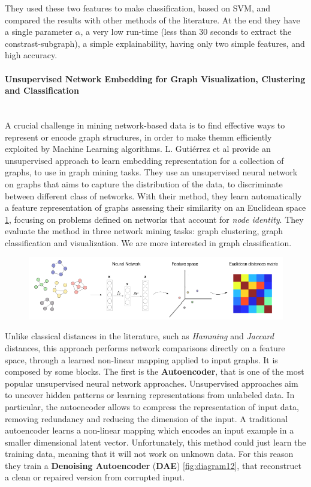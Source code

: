 They used these two features to make classification, based on SVM, and compared the results with other methods of the literature. At the end they have a single parameter $\alpha$, a very low run-time (less than 30 seconds to extract the constrast-subgraph), a simple explainability, having only two simple features, and high accuracy. 

\paragraph{Unsupervised Network Embedding for Graph Visualization, Clustering and Classification}\
\\

A crucial challenge in mining network-based data is to find effective ways to represent or encode graph structures, in order to make themm efficiently exploited by Machine Learning algorithms. L. Gutiérrez et al \cite{GutierrezUn} provide an unsupervised approach to learn embedding representation for a collection of graphs, to use in graph mining tasks. They use an unsupervised neural network on graphs that aims to capture the distribution of the data, to discriminate between different class of networks. With their method, they learn automatically a feature representation of graphs assessing their similarity on an Euclidean space \ref{fig:diagram11}, focusing on problems defined on networks that account for \textit{node identity}. They evaluate the method in three network mining tasks: graph clustering, graph classification and visualization. We are more interested in graph classification.

\begin{figure}[htbp]
	\centering
	\includegraphics[scale=0.5]{Immagini/Unsupervised.PNG}
	\caption{\label{fig:diagram11}}
\end{figure}


Unlike classical distances in the literature, such as \textit{Hamming} and \textit{Jaccard} distances, this approach performs network comparisons directly on a feature space, through a learned non-linear mapping applied to input graphs. It is composed by some blocks. The first is the \textbf{Autoencoder}, that is one of the most popular unsupervised neural network approaches. Unsupervised approaches aim to uncover hidden patterns or learning representations from unlabeled data. In particular, the autoencoder allows to compress the representation of input data, removing redundancy and reducing the dimension of the input. A traditional autoencoder learns a non-linear mapping which encodes an input example in a smaller dimensional latent vector. Unfortunately, this method could just learn the training data, meaning that it will not work on unknown data. For this reason they train a \textbf{Denoising Autoencoder} (\textbf{DAE}) \ref{fig:diagram12}, that reconstruct a clean or repaired version from corrupted input.

